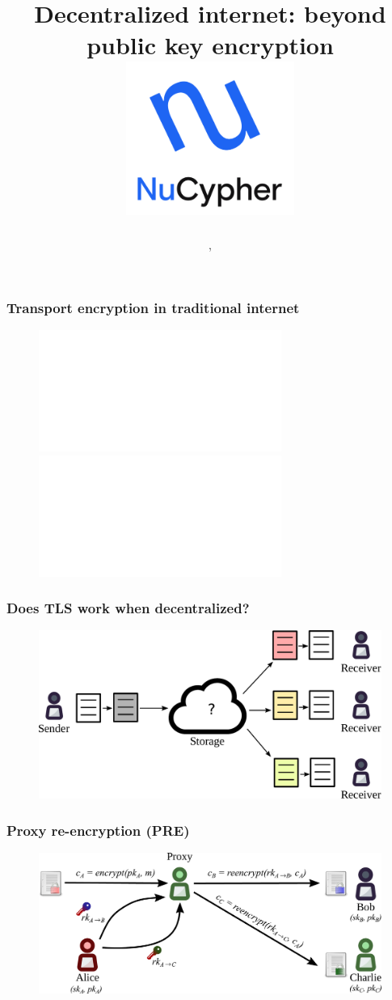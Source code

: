 \documentclass[xetex,mathsans,sans,aspectratio=169]{beamer}
\title[\titlefooter]{Decentralized internet: beyond public key encryption
\includegraphics[width=5.5cm]{pdf/nucypher_logo.pdf}}
\author[\presenterfooter]{\presenter}
\date[\eventdate]{\event, \eventdate}
\begin{document}
    \begin{frame}
        \titlepage
    \end{frame}

    \begin{frame}
        \frametitle{Transport encryption in traditional internet}
        \begin{figure}
            \centering
            \includegraphics<1>[width=\textwidth]{pdf/file-sharing-tls.pdf}\includegraphics<2>[width=\textwidth]{pdf/file-sharing-tls-danger.pdf}
        \end{figure}
    \end{frame}

    \begin{frame}
        \frametitle{Does TLS work when decentralized?}
        \begin{figure}
            \centering
            \includegraphics[width=\textwidth]{pdf/file-sharing.pdf}
        \end{figure}
    \end{frame}

    \begin{frame}
        \frametitle{Proxy re-encryption (PRE)}
        \begin{figure}
            \centering
            \includegraphics[width=\textwidth]{pdf/pre-multi.pdf}
        \end{figure}
    \end{frame}
\end{document}
